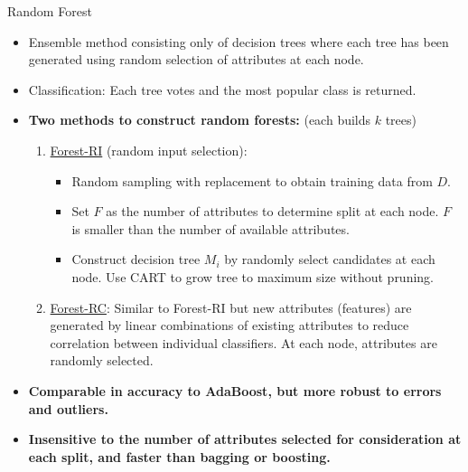 \begin{frame}{Random Forest}
	\begin{itemize}
		\item Ensemble method consisting only of decision trees where each tree has been generated using random selection of attributes at each node.
		\item Classification: Each tree votes and the most popular class is returned.
		\item \textbf{Two methods to construct random forests:} (each builds $k$ trees)
		      \begin{enumerate}
			      \item \underline{Forest-RI} (random input selection):
			            \begin{itemize}
				            \item Random sampling with replacement to obtain training data from $D$.
				            \item Set $F$ as the number of attributes to determine split at each node. $F$ is smaller than the number of available attributes.
				            \item Construct decision tree $M_i$ by randomly select candidates at each node. Use CART to grow tree to maximum size without pruning.
			            \end{itemize}
			      \item \underline{Forest-RC}: Similar to Forest-RI but new attributes (features) are generated by linear combinations of existing attributes to reduce correlation between individual classifiers. At each node, attributes are randomly selected.

		      \end{enumerate}
		\item \textbf{Comparable in accuracy to AdaBoost, but more robust to errors and outliers.}
		\item \textbf{Insensitive to the number of attributes selected for consideration at each split, and faster than bagging or boosting.}
	\end{itemize}
\end{frame}


